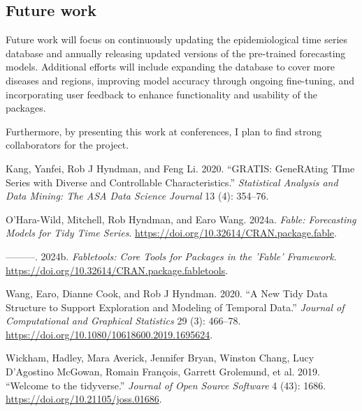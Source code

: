 \documentclass[
]{article}
\newlength{\cslhangindent}
\newenvironment{CSLReferences}[2] %
 {\begin{list}{}{%
  \setlength{\itemindent}{0pt}
  \setlength{\leftmargin}{0pt}
  \setlength{\parsep}{0pt}
  \ifodd #1
   \setlength{\leftmargin}{\cslhangindent}
   \setlength{\itemindent}{-1\cslhangindent}
  \fi
  \setlength{\itemsep}{#2\baselineskip}}}
 {\end{list}}
\begin{document}
\subsection{Future work}\label{future-work}

Future work will focus on continuously updating the epidemiological time
series database and annually releasing updated versions of the
pre-trained forecasting models. Additional efforts will include
expanding the database to cover more diseases and regions, improving
model accuracy through ongoing fine-tuning, and incorporating user
feedback to enhance functionality and usability of the packages.

Furthermore, by presenting this work at conferences, I plan to find
strong collaborators for the project.

\label{refs}
\begin{CSLReferences}{1}{0}
Kang, Yanfei, Rob J Hyndman, and Feng Li. 2020. {``GRATIS: GeneRAting
TIme Series with Diverse and Controllable Characteristics.''}
\emph{Statistical Analysis and Data Mining: The ASA Data Science
Journal} 13 (4): 354--76.

O'Hara-Wild, Mitchell, Rob Hyndman, and Earo Wang. 2024a. \emph{Fable:
Forecasting Models for Tidy Time Series}.
\url{https://doi.org/10.32614/CRAN.package.fable}.

---------. 2024b. \emph{Fabletools: Core Tools for Packages in the
'Fable' Framework}.
\url{https://doi.org/10.32614/CRAN.package.fabletools}.

Wang, Earo, Dianne Cook, and Rob J Hyndman. 2020. {``A New Tidy Data
Structure to Support Exploration and Modeling of Temporal Data.''}
\emph{Journal of Computational and Graphical Statistics} 29 (3):
466--78. \url{https://doi.org/10.1080/10618600.2019.1695624}.

Wickham, Hadley, Mara Averick, Jennifer Bryan, Winston Chang, Lucy
D'Agostino McGowan, Romain François, Garrett Grolemund, et al. 2019.
{``Welcome to the {tidyverse}.''} \emph{Journal of Open Source Software}
4 (43): 1686. \url{https://doi.org/10.21105/joss.01686}.

\end{CSLReferences}
\end{document}
